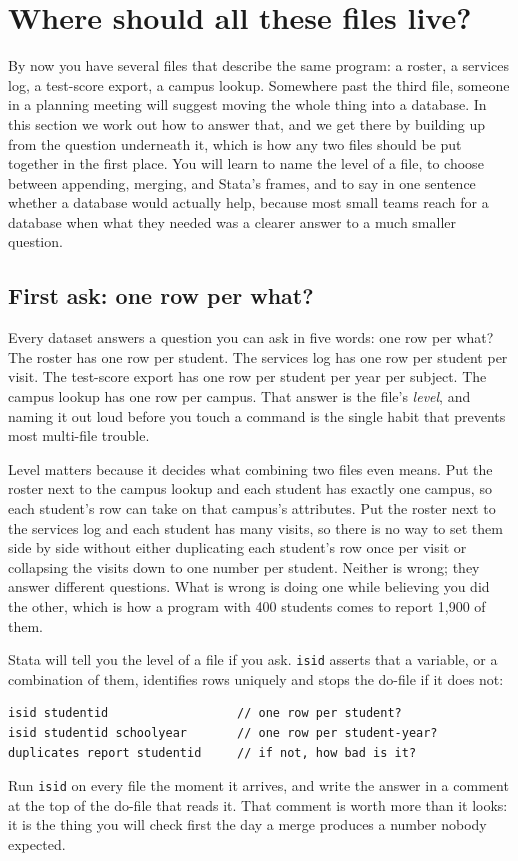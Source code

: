 \section{Where should all these files live?}\label{sec:ch06-database}
By now you have several files that describe the same program: a roster, a services log, a test-score export, a campus lookup. Somewhere past the third file, someone in a planning meeting will suggest moving the whole thing into a database. In this section we work out how to answer that, and we get there by building up from the question underneath it, which is how any two files should be put together in the first place. You will learn to name the level of a file, to choose between appending, merging, and Stata's frames, and to say in one sentence whether a database would actually help, because most small teams reach for a database when what they needed was a clearer answer to a much smaller question.

\subsection{First ask: one row per what?}\label{sec:ch06-grain}
Every dataset answers a question you can ask in five words: one row per what? The roster has one row per student. The services log has one row per student per visit. The test-score export has one row per student per year per subject. The campus lookup has one row per campus. That answer is the file's \emph{level}, and naming it out loud before you touch a command is the single habit that prevents most multi-file trouble.

Level matters because it decides what combining two files even means. Put the roster next to the campus lookup and each student has exactly one campus, so each student's row can take on that campus's attributes. Put the roster next to the services log and each student has many visits, so there is no way to set them side by side without either duplicating each student's row once per visit or collapsing the visits down to one number per student. Neither is wrong; they answer different questions. What is wrong is doing one while believing you did the other, which is how a program with 400 students comes to report 1,900 of them.

Stata will tell you the level of a file if you ask. \texttt{isid} asserts that a variable, or a combination of them, identifies rows uniquely and stops the do-file if it does not:
\par
{\footnotesize
\begin{verbatim}
isid studentid                  // one row per student?
isid studentid schoolyear       // one row per student-year?
duplicates report studentid     // if not, how bad is it?
\end{verbatim}
}
Run \texttt{isid} on every file the moment it arrives, and write the answer in a comment at the top of the do-file that reads it. That comment is worth more than it looks: it is the thing you will check first the day a merge produces a number nobody expected.

